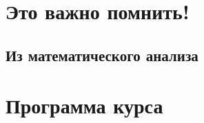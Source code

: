 
\LARGE



\section*{Это важно помнить!}
\subsection*{Из математического анализа}



\newpage
\section*{Программа курса}





